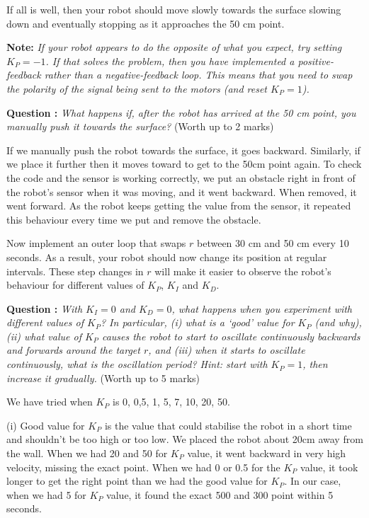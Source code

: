 \documentclass[hidelinks,a4paper,11pt]{article}
\newcounter{question}
\newcommand\myq{\refstepcounter{question}\thequestion}
\begin{document}
If all is well, then your robot should move slowly towards the surface slowing down and eventually stopping as it approaches the 50 cm point.

{\bfseries Note:}  \emph{If your robot appears to do the opposite of what you expect, try setting $K_P=-1$.  If that solves the problem, then you have implemented a positive-feedback rather than a negative-feedback loop.  This means that you need to swap the polarity of the signal being sent to the motors (and reset $K_P=1$).}

{\bfseries Question \myq:}  \emph{What happens if, after the robot has arrived at the 50 cm point, you manually push it towards the surface?} (Worth up to 2 marks)\\
\begin{mdframed}
If we manually push the robot towards the surface, it goes backward. Similarly, if we place it further then it moves toward to get to the 50cm point again. To check the code and the sensor is working correctly, we put an obstacle right in front of the robot’s sensor when it was moving, and it went backward. When removed, it went forward. As the robot keeps getting the value from the sensor, it repeated this behaviour every time we put and remove the obstacle.
\end{mdframed}
\vspace*{\baselineskip}

Now implement an outer loop that swaps $r$ between 30 cm and 50 cm every 10 seconds.  As a result, your robot should now change its position at regular intervals.  These step changes in $r$ will make it easier to observe the robot's behaviour for different values of $K_P$, $K_I$ and $K_D$.

{\bfseries Question \myq:}  \emph{With $K_I=0$ and $K_D=0$, what happens when you experiment with different values of $K_P$?  In particular, (i) what is a `good' value for $K_P$ (and why), (ii) what value of $K_P$ causes the robot to start to oscillate continuously backwards and forwards around the target $r$, and (iii) when it starts to oscillate continuously, what is the oscillation period?  Hint: start with $K_P =1$, then increase it gradually.} (Worth up to 5 marks)\\
\begin{mdframed}
We have tried when $K_P$ is 0, 0,5, 1, 5, 7, 10, 20, 50.

(i) Good value for $K_P$ is the value that could stabilise the robot in a short time and shouldn't be too high or too low. We placed the robot about 20cm away from the wall. When we had 20 and 50 for $K_P$ value, it went backward in very high velocity, missing the exact point. When we had 0 or 0.5 for the $K_P$ value, it took longer to get the right point than we had the good value for $K_P$. In our case, when we had 5 for $K_P$ value, it found the exact 500 and 300 point within 5 seconds.
\end{mdframed}
\vspace*{\baselineskip}
\end{document}
